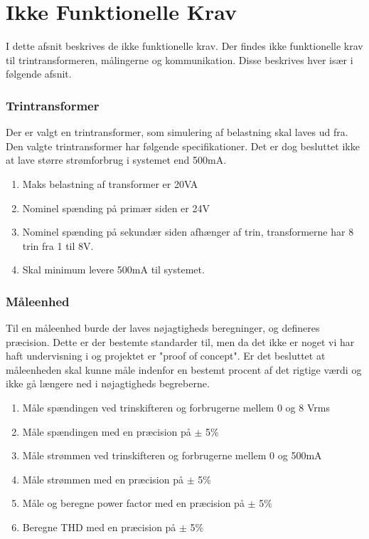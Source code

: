 
\section{Ikke Funktionelle Krav}
I dette afsnit beskrives de ikke funktionelle krav. Der findes ikke funktionelle krav til trintransformeren, målingerne og kommunikation. Disse beskrives hver især i følgende afsnit.

\subsubsection{Trintransformer}
Der er valgt en trintransformer, som simulering af belastning skal laves ud fra. Den valgte trintransformer har følgende specifikationer. Det er dog besluttet ikke at lave større strømforbrug i systemet end 500mA. 

\begin{enumerate}
	\item Maks belastning af transformer er 20VA
	\item Nominel spænding på primær siden er 24V
	\item Nominel spænding på sekundær siden afhænger af trin, transformerne har 8 trin fra 1 til 8V.
	\item Skal minimum levere 500mA til systemet. 
\end{enumerate}

\subsubsection{Måleenhed}
Til en måleenhed burde der laves nøjagtigheds beregninger, og defineres præcision. Dette er der bestemte standarder til, men da det ikke er noget vi har haft undervisning i og projektet er "proof of concept". Er det besluttet at måleenheden skal kunne måle indenfor en bestemt procent af det rigtige værdi og ikke gå længere ned i nøjagtigheds begreberne.

\begin{enumerate}
	\item Måle spændingen ved trinskifteren og forbrugerne mellem 0 og 8 Vrms
	\item Måle spændingen med en præcision på $\pm$ 5\%
	\item Måle strømmen ved trinskifteren og forbrugerne mellem 0 og 500mA
	\item Måle strømmen med en præcision på $\pm$ 5\%
	\item Måle og beregne power factor med en præcision på $\pm$ 5$\%$
	\item Beregne THD med en præcision på $\pm$ 5$\%$
\end{enumerate} 

